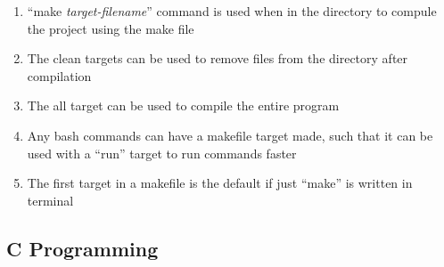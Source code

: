 \documentclass[11 pt, twoside]{article}
\begin{document}
\begin{enumerate}
\begin{enumerate}
\item ``make \textit{target-filename}'' command is used when in the directory to compule the project using the make file
\item The clean targets can be used to remove files from the directory after compilation
\item The all target can be used to compile the entire program
\item Any bash commands can have a makefile target made, such that it can be used with a ``run'' target to run commands faster
\item The first target in a makefile is the default if just ``make'' is written in terminal
\end{enumerate}
\end{enumerate}

\subsection{C Programming}
\end{document}

